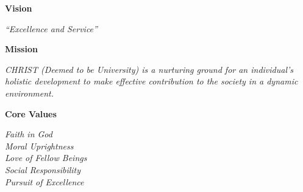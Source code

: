 \clearpage
\thispagestyle{empty}
\ChristHeader

\vspace{0.5cm}

\begin{center}
  {\color{christBlue}\bfseries\LARGE Vision\par}
\end{center}
\vspace{0.1cm}
\begin{tcolorbox}[christbluebox]
\centering\itshape ``Excellence and Service''
\end{tcolorbox}

\vspace{0.5cm}

\begin{center}
  {\color{christBlue}\bfseries\LARGE Mission\par}
\end{center}
\vspace{0.1cm}
\begin{tcolorbox}[christgoldbox]
\itshape CHRIST (Deemed to be University) is a nurturing ground for an individual’s holistic development to make effective contribution to the society in a dynamic environment.
\end{tcolorbox}

\vspace{0.5cm}

\begin{center}
  {\color{christBlue}\bfseries\LARGE Core Values\par}
\end{center}
\vspace{0.1cm}
\begin{tcolorbox}[christgreenbox]
\centering\itshape
Faith in God\\
Moral Uprightness\\
Love of Fellow Beings\\
Social Responsibility\\
Pursuit of Excellence
\end{tcolorbox}
